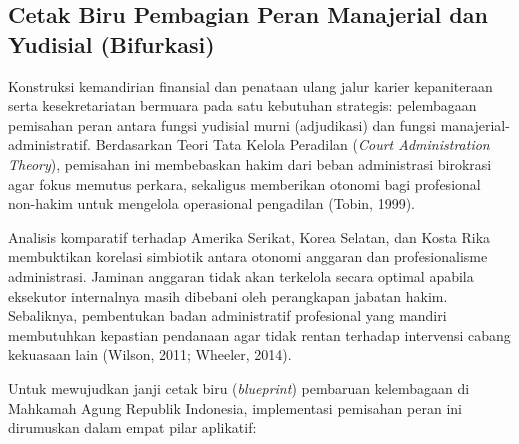 \documentclass[12pt, a4paper]{article}
\begin{document}
\subsection{Cetak Biru Pembagian Peran Manajerial dan Yudisial (Bifurkasi)}

Konstruksi kemandirian finansial dan penataan ulang jalur karier kepaniteraan serta kesekretariatan bermuara pada satu kebutuhan strategis: pelembagaan pemisahan peran antara fungsi yudisial murni (adjudikasi) dan fungsi manajerial-administratif. Berdasarkan Teori Tata Kelola Peradilan (\textit{Court Administration Theory}), pemisahan ini membebaskan hakim dari beban administrasi birokrasi agar fokus memutus perkara, sekaligus memberikan otonomi bagi profesional non-hakim untuk mengelola operasional pengadilan (Tobin, 1999).

Analisis komparatif terhadap Amerika Serikat, Korea Selatan, dan Kosta Rika membuktikan korelasi simbiotik antara otonomi anggaran dan profesionalisme administrasi. Jaminan anggaran tidak akan terkelola secara optimal apabila eksekutor internalnya masih dibebani oleh perangkapan jabatan hakim. Sebaliknya, pembentukan badan administratif profesional yang mandiri membutuhkan kepastian pendanaan agar tidak rentan terhadap intervensi cabang kekuasaan lain (Wilson, 2011; Wheeler, 2014). 

Untuk mewujudkan janji cetak biru (\textit{blueprint}) pembaruan kelembagaan di Mahkamah Agung Republik Indonesia, implementasi pemisahan peran ini dirumuskan dalam empat pilar aplikatif:
\end{document}
